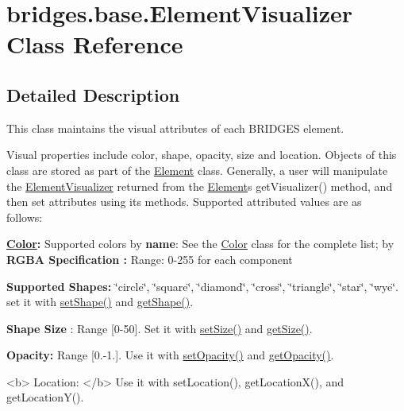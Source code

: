 \hypertarget{classbridges_1_1base_1_1_element_visualizer}{}\section{bridges.\+base.\+Element\+Visualizer Class Reference}
\label{classbridges_1_1base_1_1_element_visualizer}


\subsection{Detailed Description}
This class maintains the visual attributes of each B\+R\+I\+D\+G\+ES element. 

Visual properties include color, shape, opacity, size and location. Objects of this class are stored as part of the \mbox{\hyperlink{classbridges_1_1base_1_1_element}{Element}} class. Generally, a user will manipulate the \mbox{\hyperlink{classbridges_1_1base_1_1_element_visualizer}{Element\+Visualizer}} returned from the \mbox{\hyperlink{classbridges_1_1base_1_1_element}{Element}}\textquotesingle{}s get\+Visualizer() method, and then set attributes using its methods. Supported attributed values are as follows\+:~\newline


{\bfseries \mbox{\hyperlink{classbridges_1_1base_1_1_color}{Color}}\+:} Supported colors by {\bfseries name}\+: See the \mbox{\hyperlink{classbridges_1_1base_1_1_color}{Color}} class for the complete list; by {\bfseries R\+G\+BA Specification \+:} Range\+: 0-\/255 for each component

{\bfseries  Supported Shapes\+: } \char`\"{}circle\char`\"{}, \char`\"{}square\char`\"{}, \char`\"{}diamond\char`\"{}, \char`\"{}cross\char`\"{}, \char`\"{}triangle\char`\"{}, \char`\"{}star\char`\"{}, \char`\"{}wye\char`\"{}. set it with \mbox{\hyperlink{classbridges_1_1base_1_1_element_visualizer_ac3bad991904c8ad23e5233b341381d93}{set\+Shape()}} and \mbox{\hyperlink{classbridges_1_1base_1_1_element_visualizer_a8ef0825745e49f32b57e4bf6c891b57e}{get\+Shape()}}.

{\bfseries  Shape Size} \+: Range \mbox{[}0-\/50\mbox{]}. Set it with \mbox{\hyperlink{classbridges_1_1base_1_1_element_visualizer_aba410184f7df495594fc1fa7948335a5}{set\+Size()}} and \mbox{\hyperlink{classbridges_1_1base_1_1_element_visualizer_a0b7673bf724e3df1f94df50ad95ca5b1}{get\+Size()}}.

{\bfseries  Opacity\+: } Range \mbox{[}0.-\/1.\mbox{]}. Use it with \mbox{\hyperlink{classbridges_1_1base_1_1_element_visualizer_a932f62eb1bd0c92da265a7f903dd0790}{set\+Opacity()}} and \mbox{\hyperlink{classbridges_1_1base_1_1_element_visualizer_ab86ff39f17f8d1766670b18be88b5492}{get\+Opacity()}}. \begin{DoxyVerb}<b> Location: </b> Use it with setLocation(), getLocationX(), and getLocationY().
\end{DoxyVerb}


